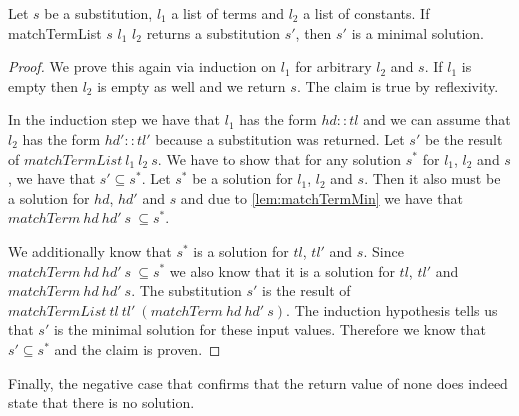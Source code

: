 \begin{lemma}[\matchTermListFindsMinimalSolution]
    Let $s$ be a substitution, $l_1$ a list of terms and $l_2$ a list of constants. If matchTermList $s$ $l_1$ $l_2$ returns a substitution $s'$, then $s'$ is a minimal solution.
\end{lemma}
\begin{proof}
    We prove this again via induction on $l_1$ for arbitrary $l_2$ and $s$. If $l_1$ is empty then $l_2$ is empty as well and we return $s$. The claim is true by reflexivity.

    In the induction step we have that $l_1$ has the form $hd::tl$ and we can assume that $l_2$ has the form $hd'::tl'$ because a substitution was returned. Let $s'$ be the result of $matchTermList\ l_1\ l_2\ s$. We have to show that for any solution $s^\ast$ for $l_1$, $l_2$ and $s$, we have that $s' \subseteq s^\ast$.
    Let $s^\ast$ be a solution for $l_1$, $l_2$ and $s$. Then it also must be a solution for $hd$, $hd'$ and $s$ and due to \cref{lem:matchTermMin} we have that $matchTerm\ hd\ hd'\ s\ \subseteq s^\ast$. 

    We additionally know that $s^\ast$ is a solution for $tl$, $tl'$ and $s$. Since $matchTerm\ hd\ hd'\ s\ \subseteq s^\ast$ we also know that it is a solution for $tl$, $tl'$ and $matchTerm\ hd\ hd'\ s$.  The substitution $s'$ is the result of $matchTermList\ tl\ tl'\ (matchTerm\ hd\ hd'\ s)$. The induction hypothesis tells us that $s'$ is the minimal solution for these input values. Therefore we know that $s' \subseteq s^\ast$ and the claim is proven. 
    
\end{proof}

Finally, the negative case that confirms that the return value of none does indeed state that there is no solution.

